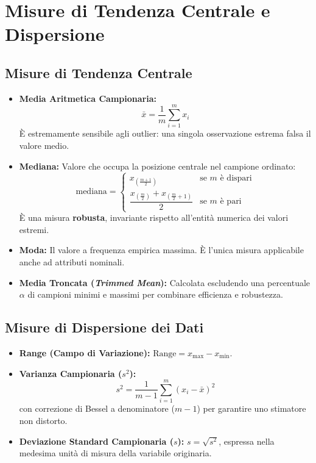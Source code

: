 \FloatBarrier
\section{Misure di Tendenza Centrale e Dispersione}

\subsection{Misure di Tendenza Centrale}
\begin{itemize}
    \item \textbf{Media Aritmetica Campionaria:}
    \begin{equation}
        \bar{x} = \frac{1}{m} \sum_{i=1}^m x_i
    \end{equation}
    \`E estremamente sensibile agli outlier: una singola osservazione estrema falsa il valore medio.
    \item \textbf{Mediana:} Valore che occupa la posizione centrale nel campione ordinato:
    \begin{equation}
        \text{mediana} = \begin{cases}
        x_{\left(\frac{m+1}{2}\right)} & \text{se } m \text{ \`e dispari} \\[6pt]
        \dfrac{x_{\left(\frac{m}{2}\right)} + x_{\left(\frac{m}{2} + 1\right)}}{2} & \text{se } m \text{ \`e pari}
        \end{cases}
    \end{equation}
    \`E una misura \textbf{robusta}, invariante rispetto all'entit\`a numerica dei valori estremi.
    \item \textbf{Moda:} Il valore a frequenza empirica massima. \`E l'unica misura applicabile anche ad attributi nominali.
    \item \textbf{Media Troncata (\textit{Trimmed Mean}):} Calcolata escludendo una percentuale $\alpha$ di campioni minimi e massimi per combinare efficienza e robustezza.
\end{itemize}

\subsection{Misure di Dispersione dei Dati}
\begin{itemize}
    \item \textbf{Range (Campo di Variazione):} $\text{Range} = x_{\max} - x_{\min}$.
    \item \textbf{Varianza Campionaria ($s^2$):}
    \begin{equation}
        s^2 = \frac{1}{m-1} \sum_{i=1}^m (x_i - \bar{x})^2
    \end{equation}
    con correzione di Bessel a denominatore ($m-1$) per garantire uno stimatore non distorto.
    \item \textbf{Deviazione Standard Campionaria ($s$):} $s = \sqrt{s^2}$, espressa nella medesima unit\`a di misura della variabile originaria.
\end{itemize}

